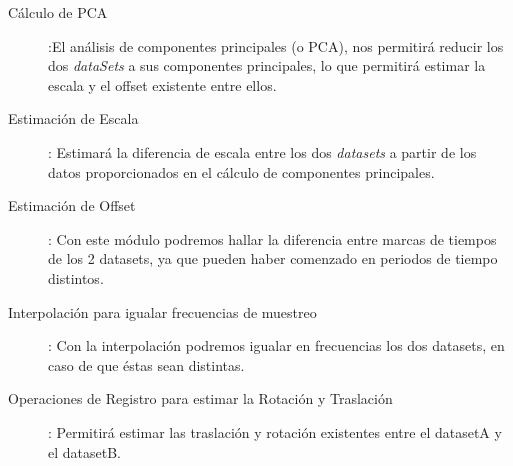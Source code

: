 \begin{description}
\item [Cálculo de PCA]:El análisis de componentes principales (o PCA), nos permitirá reducir los dos  \textit{dataSets} a sus componentes principales, lo que permitirá estimar la escala y el offset existente entre ellos.
\item [Estimación de Escala]: Estimará la diferencia de escala entre los dos \textit{datasets} a partir de los datos proporcionados en el cálculo de componentes principales.
\item [Estimación de Offset]: Con este módulo podremos hallar la diferencia entre marcas de tiempos de los 2 datasets, ya que pueden haber comenzado en periodos de tiempo distintos.
\item [Interpolación para igualar frecuencias de muestreo]: Con la interpolación podremos igualar en frecuencias los dos datasets, en caso de que éstas sean distintas.
\item [Operaciones de Registro para estimar la Rotación y Traslación]: Permitirá estimar las traslación y rotación existentes entre el datasetA y el datasetB.
\end{description}



